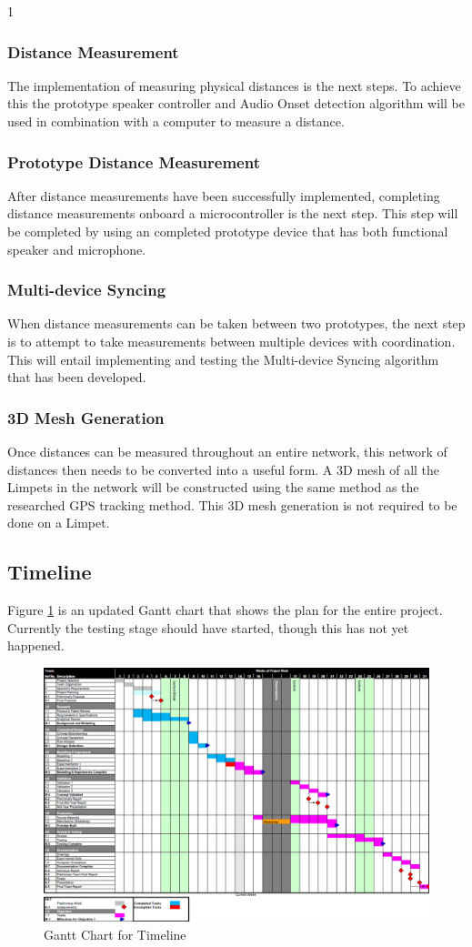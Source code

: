 1\documentclass{article}
\begin{document}
\subsubsection{Distance Measurement}
The implementation of measuring physical distances is the next steps. To achieve this the prototype speaker controller and Audio Onset detection algorithm will be used in combination with a computer to measure a distance.
\subsubsection{Prototype Distance Measurement}
After distance measurements have been successfully implemented, completing distance measurements onboard a microcontroller is the next step. This step will be completed by using an completed prototype device that has both functional speaker and microphone.
\subsubsection{Multi-device Syncing}
When distance measurements can be taken between two prototypes, the next step is to attempt to take measurements between multiple devices with coordination. This will entail implementing and testing the Multi-device Syncing algorithm that has been developed.
\subsubsection{3D Mesh Generation}
Once distances can be measured throughout an entire network, this network of distances then needs to be converted into a useful form. A 3D mesh of all the Limpets in the network will be constructed using the same method as the researched GPS tracking method. This 3D mesh generation is not required to be done on a Limpet.

\subsection{Timeline}
Figure \ref{fig:gantt} is an updated Gantt chart that shows the plan for the entire project. Currently the testing stage should have started, though this has not yet happened.
\begin{figure}[H]
	\centering
	\noindent\includegraphics[width=\textwidth]{images/gantt}
	\caption{Gantt Chart for Timeline}
	\label{fig:gantt}
\end{figure}
\end{document}
